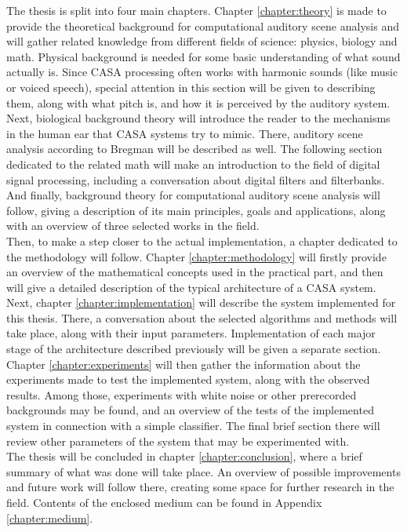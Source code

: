 The thesis is split into four main chapters. Chapter \ref{chapter:theory} is made to provide the theoretical background for computational auditory scene analysis and will gather related knowledge from dif\-fer\-ent fields of science: physics, biology and math. Physical background is needed for some basic understanding of what sound actually is. Since CASA processing often works with harmonic sounds (like music or voiced speech), special attention in this section will be given to describing them, along with what pitch is, and how it is perceived by the auditory system. Next, biological background theory will introduce the reader to the mechanisms in the human ear that CASA systems try to mimic. There, auditory scene analysis according to Bregman will be described as well. The following section dedicated to the related math will make an introduction to the field of digital signal processing, including a conversation about digital filters and filterbanks. And finally, background theory for computational auditory scene analysis will follow, giving a description of its main principles, goals and applications, along with an overview of three selected works in the field.\\

Then, to make a step closer to the actual implementation, a chapter dedicated to the methodology will follow. Chapter \ref{chapter:methodology} will firstly provide an overview of the mathematical concepts used in the practical part, and then will give a detailed description of the typical architecture of a CASA system.\\

Next, chapter \ref{chapter:implementation} will describe the system implemented for this thesis. There, a conversation about the selected algorithms and methods will take place, along with their input parameters. Implementation of each major stage of the architecture described previously will be given a separate section.\\

Chapter \ref{chapter:experiments} will then gather the information about the experiments made to test the implemented system, along with the observed results. Among those, experiments with white noise or other prerecorded backgrounds may be found, and an overview of the tests of the implemented system in connection with a simple classifier. The final brief section there will review other parameters of the system that may be experimented with.\\

The thesis will be concluded in chapter \ref{chapter:conclusion}, where a brief summary of what was done will take place. An overview of possible improvements and future work will follow there, creating some space for further research in the field. Contents of the enclosed medium can be found in Appendix \ref{chapter:medium}.\\

